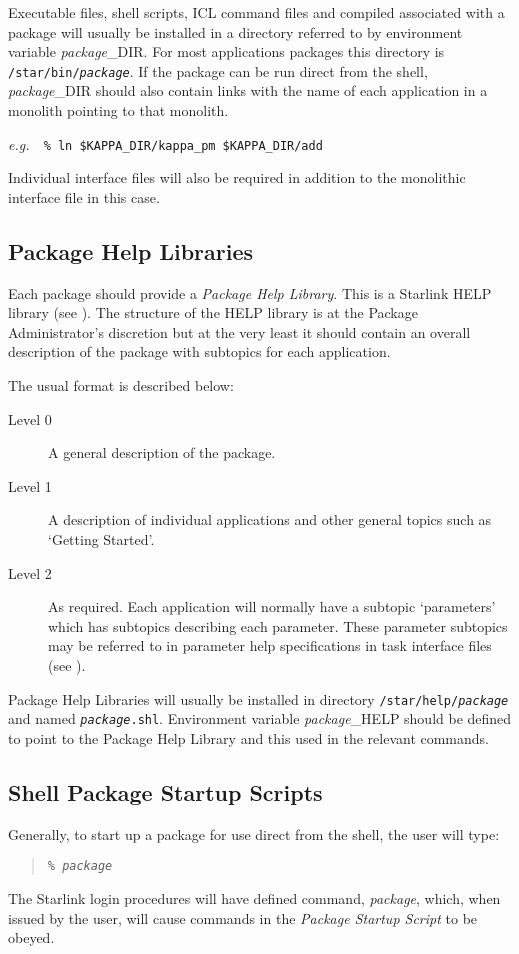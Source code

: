 \documentclass[twoside,11pt,nolof]{starlink}
\begin{document}
Executable files, shell scripts, ICL command files and compiled
associated with a package will usually be installed in a directory referred to
by environment variable \textit{package}\_DIR.
For most applications packages this directory is
\texttt{/star/bin/\textit{package}}.
If the package can be run direct from the shell, \textit{package}\_DIR should
also contain links with the name of each application in a monolith pointing
to that monolith.

\textit{e.g.}\ \texttt{ \% ln \$KAPPA\_DIR/kappa\_pm \$KAPPA\_DIR/add }

Individual interface files will also be required in addition to the monolithic
interface file in this case.

\subsection{Package Help Libraries}
Each package should provide a \textit{Package Help Library}.
This is a Starlink HELP library (see
).
The structure of the HELP library is at the Package Administrator's discretion
but at the very least it should contain an overall description of the package
with subtopics for each application.

The usual format is described below:
\begin{description}
\item[Level 0] A general description of the package.
\item[Level 1] A description of individual applications and other general
topics such as `Getting Started'.
\item[Level 2] As required. Each application will normally have a
subtopic `parameters' which has subtopics describing each parameter.
These parameter subtopics may be referred to in parameter help
specifications in task interface files (see
).
\end{description}
Package Help Libraries will usually be installed in directory
\texttt{/star/help/\textit{package}} and named \texttt{\textit{package}.shl}.
Environment variable \textit{package}\_HELP should be defined to point to the
Package Help Library and this used in the relevant commands.

\subsection{Shell Package Startup Scripts}
Generally, to start up a package for use direct from the shell, the
user will type:
\begin{quote}
\texttt{\% \textit{package}}
\end{quote}
The Starlink login procedures will have defined command, \textit{package}, which,
when issued by the user, will cause commands in the \textit{Package Startup
Script} to be obeyed.
\end{document}
